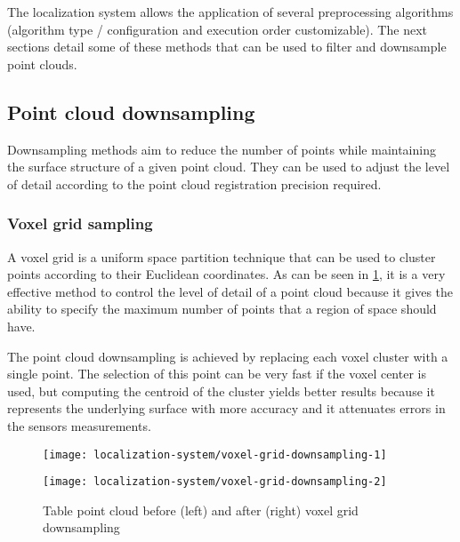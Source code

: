 The localization system allows the application of several preprocessing algorithms (algorithm type / configuration and execution order customizable). The next sections detail some of these methods that can be used to filter and downsample point clouds.


\subsection{Point cloud downsampling}

Downsampling methods aim to reduce the number of points while maintaining the surface structure of a given point cloud. They can be used to adjust the level of detail according to the point cloud registration precision required.


\subsubsection{Voxel grid sampling}

A voxel grid is a uniform space partition technique that can be used to cluster points according to their Euclidean coordinates. As can be seen in \cref{fig:localization_system_voxel-grid-downsampling}, it is a very effective method to control the level of detail of a point cloud because it gives the ability to specify the maximum number of points that a region of space should have.

The point cloud downsampling is achieved by replacing each voxel cluster with a single point. The selection of this point can be very fast if the voxel center is used, but computing the centroid of the cluster yields better results because it represents the underlying surface with more accuracy and it attenuates errors in the sensors measurements.


\begin{figure}[H]
	\centering
	\begin{minipage}[h]{0.495\textwidth}
		\centering
			\texttt{[image: localization-system/voxel-grid-downsampling-1]}
	\end{minipage}\hfill
	\begin{minipage}[h]{.495\textwidth}
		\centering
	\texttt{[image: localization-system/voxel-grid-downsampling-2]}
	\end{minipage}
	\caption[Table point cloud before (left) and after (right) voxel grid downsampling]{Table point cloud before (left) and after (right) voxel grid downsampling\protect\footnotemark}
	\label{fig:localization_system_voxel-grid-downsampling}
\end{figure}



